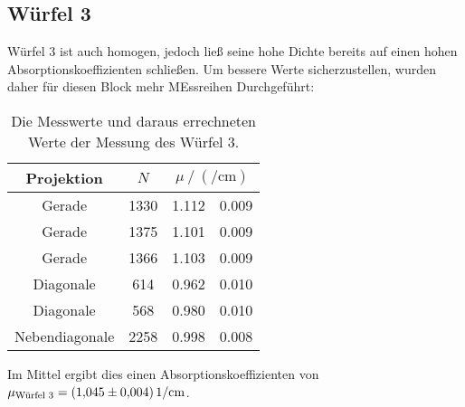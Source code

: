   \subsection{Würfel 3}
    Würfel 3 ist auch homogen, jedoch ließ seine hohe Dichte bereits auf einen hohen Absorptionskoeffizienten schließen. 
    Um bessere Werte sicherzustellen, wurden daher für diesen Block mehr MEssreihen Durchgeführt:
    \begin{table}[H]
     \centering
     \caption{Die Messwerte und daraus errechneten Werte der Messung des Würfel 3.}
     \label{tab:w2}
     \begin{tabular}{c S[table-format=4.0] S[table-format=1.3] @{${}\pm{}$} S[table-format=1.3]}
       \toprule
       {Projektion} &  &  \\
       \midrule
       Gerade & 1330 & 1.112 & 0.009 \\
       Gerade & 1375 & 1.101 & 0.009 \\
       Gerade & 1366 & 1.103 & 0.009 \\
       Diagonale & 614 & 0.962 & 0.010 \\
       Diagonale & 568 & 0.980 & 0.010 \\
       Nebendiagonale & 2258 & 0.998 & 0.008 \\
       \bottomrule  
     \end{tabular}
    \end{table} 
    Im Mittel ergibt dies einen Absorptionskoeffizienten von $\mu_\t{Würfel 3} = \SI{1.045(0004)}{1\per\centi\metre}$.

